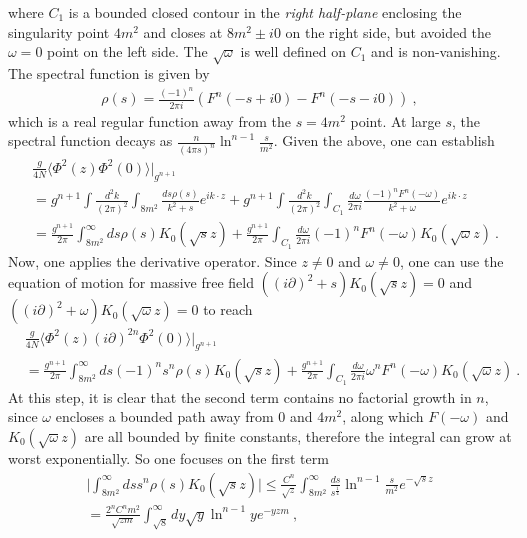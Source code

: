 \documentclass[a4paper,11pt]{article}
\begin{document}
where $C_1$ is a bounded closed contour in the {\it right half-plane}  enclosing the singularity point $4m^2$ and closes at $8m^2\pm i0$ on the right side, but avoided the $\omega=0$ point on the left side. The $\sqrt{\omega}$ is well defined on $C_1$ and is non-vanishing. The spectral function is given by
\begin{align}
\rho(s)=\frac{(-1)^{n}}{2\pi i}\left(F^n(-s+i0)-F^n(-s-i0)\right) \ ,
\end{align}
which is a real regular function away from the $s=4m^2$ point. At large $s$, the spectral function decays as $\frac{n}{(4\pi s)^n}\ln^{n-1} \frac{s}{m^2}$. Given the above, one can establish 
\begin{align}
&\frac{g}{4N}\langle\Phi^2(z)\Phi^2(0)\rangle\bigg|_{g^{n+1}}\nonumber \\ 
&=g^{n+1}\int \frac{d^2k}{(2\pi)^2}\int_{8m^2}\frac{ds \rho(s)}{k^2+s}e^{ik\cdot z}+g^{n+1}\int \frac{d^2k}{(2\pi)^2}\int_{C_1}\frac{d\omega}{2\pi i}\frac{(-1)^{n} F^n(-\omega)}{k^2+\omega}e^{ik\cdot z} \nonumber \\ 
&=\frac{g^{n+1}}{2\pi}\int_{8m^2}^\infty ds \rho(s) K_0(\sqrt{s}z)+\frac{g^{n+1}}{2\pi}\int_{C_1}\frac{d\omega}{2\pi i}(-1)^{n}F^n(-\omega)K_0(\sqrt{\omega}z) \ .
\end{align}
Now, one applies the derivative operator. Since $z\ne 0$ and $\omega \ne 0$, one can use the equation of motion for massive free field $((i\partial)^2+s)K_0(\sqrt{s}z)=0$ and $((i\partial)^2+\omega)K_0(\sqrt{\omega}z)=0$ to reach
\begin{align}
&\frac{g}{4N}\langle\Phi^2(z)(i\partial)^{2n}\Phi^2(0)\rangle\bigg|_{g^{n+1}} \nonumber \\ 
&=\frac{g^{n+1}}{2\pi}\int_{8m^2}^\infty ds (-1)^ns^n\rho(s) K_0(\sqrt{s}z)+\frac{g^{n+1}}{2\pi}\int_{C_1}\frac{d\omega}{2\pi i}\omega^nF^n(-\omega)K_0(\sqrt{\omega}z) \ .
\end{align}
At this step, it is clear that the second term contains no factorial growth in $n$, since $\omega$ encloses a bounded path away from $0$ and $4m^2$, along which $F(-\omega)$ and $K_0(\sqrt{\omega}z)$ are all bounded by finite constants, therefore the integral can grow at worst exponentially. So one focuses on the first term
\begin{align}
\bigg|\int_{8m^2}^\infty ds s^n\rho(s)K_0(\sqrt{s}z)\bigg| \le \frac{C^n}{\sqrt{z}} \int_{8m^2}^\infty \frac{ds}{s^\frac{1}{4}} \ln^{n-1}\frac{s}{m^2}e^{-\sqrt{s}z}\nonumber \\ 
=\frac{2^nC^nm^2}{\sqrt{zm}}\int_{\sqrt{8}}^{\infty} dy \sqrt{y}\ln^{n-1}y e^{-yzm} \ ,
\end{align}
\end{document}

